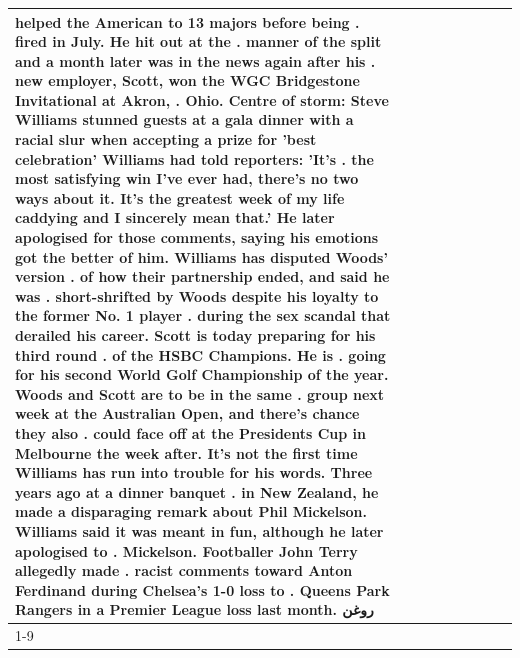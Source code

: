 \begin{table}[H]
\begin{tabular}{lllrlllll}
helped the American to 13 majors before being . fired in July. He hit out at the . manner of the split and a month later was in the news again after his . new employer, Scott, won the WGC Bridgestone Invitational at Akron, . Ohio. Centre of storm: Steve Williams stunned guests at a gala dinner with a racial slur when accepting a prize for 'best celebration' Williams had told reporters: 'It's . the most satisfying win I've ever had, there's no two ways about it. It's the greatest week of my life caddying and I sincerely mean that.' He later apologised for those comments, saying his emotions got the better of him. Williams has disputed Woods' version . of how their partnership ended, and said he was . short-shrifted by Woods despite his loyalty to the former No. 1 player . during the sex scandal that derailed his career. Scott is today preparing for his third round . of the HSBC Champions. He is . going for his second World Golf Championship of the year. Woods and Scott are to be in the same . group next week at the Australian Open, and there's chance they also . could face off at the Presidents Cup in Melbourne the week after. It's not the first time Williams has run into trouble for his words. Three years ago at a dinner banquet . in New Zealand, he made a disparaging remark about Phil Mickelson. Williams said it was meant in fun, although he later apologised to . Mickelson. Footballer John Terry allegedly made . racist comments toward Anton Ferdinand during Chelsea's 1-0 loss to . Queens Park Rangers in a Premier League loss last month. روغن \\
\cline{1-9}

\end{tabular}
\end{table}
